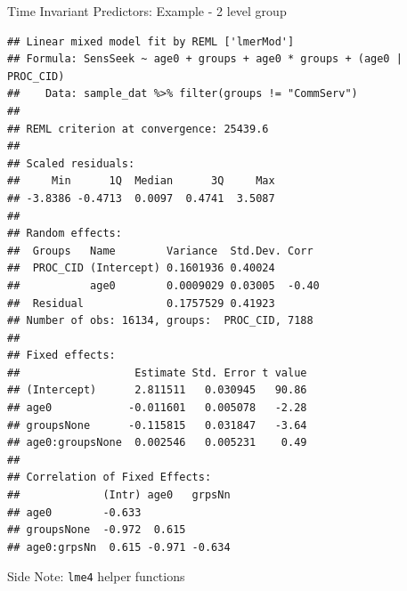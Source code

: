\begin{frame}[fragile]{Time Invariant Predictors: Example - 2 level
group}

\tiny

\begin{Shaded}
\end{Shaded}

\tiny

\begin{verbatim}
## Linear mixed model fit by REML ['lmerMod']
## Formula: SensSeek ~ age0 + groups + age0 * groups + (age0 | PROC_CID)
##    Data: sample_dat %>% filter(groups != "CommServ")
## 
## REML criterion at convergence: 25439.6
## 
## Scaled residuals: 
##     Min      1Q  Median      3Q     Max 
## -3.8386 -0.4713  0.0097  0.4741  3.5087 
## 
## Random effects:
##  Groups   Name        Variance  Std.Dev. Corr 
##  PROC_CID (Intercept) 0.1601936 0.40024       
##           age0        0.0009029 0.03005  -0.40
##  Residual             0.1757529 0.41923       
## Number of obs: 16134, groups:  PROC_CID, 7188
## 
## Fixed effects:
##                  Estimate Std. Error t value
## (Intercept)      2.811511   0.030945   90.86
## age0            -0.011601   0.005078   -2.28
## groupsNone      -0.115815   0.031847   -3.64
## age0:groupsNone  0.002546   0.005231    0.49
## 
## Correlation of Fixed Effects:
##             (Intr) age0   grpsNn
## age0        -0.633              
## groupsNone  -0.972  0.615       
## age0:grpsNn  0.615 -0.971 -0.634
\end{verbatim}

\normalsize

\end{frame}

\begin{frame}[fragile]{Side Note: \texttt{lme4} helper functions}

\begin{Shaded}
\begin{Highlighting}[]
 \NormalTok{)}
\OperatorTok{::}
\OperatorTok{::}
\end{Highlighting}
\end{Shaded}

\end{frame}

